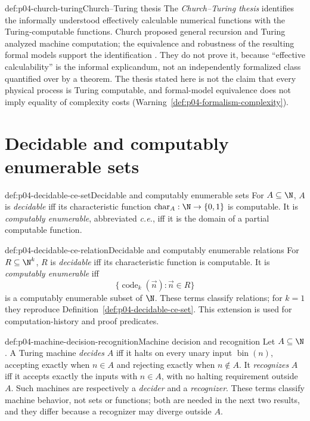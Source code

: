 \begin{proofboundary}{def:p04-church-turing}{Church--Turing thesis}
The \emph{Church--Turing thesis} identifies the informally understood
effectively calculable numerical functions with the Turing-computable
functions.  Church proposed general recursion and Turing analyzed machine
computation; the equivalence and robustness of the resulting formal models
support the identification
\cite{Church1936,Turing1937Lambda,Soare1996ComputabilityRecursion}.  They do
not prove it, because ``effective calculability'' is the informal explicandum,
not an independently formalized class quantified over by a theorem.  The
thesis stated here is not the claim that every physical process is Turing
computable, and formal-model equivalence does not imply equality of complexity
costs (Warning~\ref{def:p04-formalism-complexity}).
\end{proofboundary}

\section{Decidable and computably enumerable sets}
\label{sec:p04-decidable-ce}

\begin{hbdefinition}{def:p04-decidable-ce-set}{Decidable and computably enumerable sets}
For \(A\subseteq\N\), \(A\) is \emph{decidable} iff its characteristic
function \(\operatorname{char}_A:\N\to\{0,1\}\) is computable.  It is \emph{computably
enumerable}, abbreviated \emph{c.e.}, iff it is the domain of a partial
computable function.
\end{hbdefinition}

\begin{hbdefinition}{def:p04-decidable-ce-relation}{Decidable and computably enumerable relations}
For \(R\subseteq\N^k\), \(R\) is \emph{decidable} iff its characteristic
function is computable.  It is \emph{computably enumerable} iff
\[
  \{\operatorname{code}_k(\vec n):\vec n\in R\}
\]
is a computably enumerable subset of \(\N\).  These terms classify relations;
for \(k=1\) they reproduce Definition~\ref{def:p04-decidable-ce-set}.  This
extension is used for computation-history and proof predicates.
\end{hbdefinition}

\begin{hbdefinition}{def:p04-machine-decision-recognition}{Machine decision and recognition}
Let \(A\subseteq\N\).  A Turing machine \emph{decides} \(A\) iff it halts
on every unary input \(\operatorname{bin}(n)\), accepting exactly when
\(n\in A\) and rejecting exactly when \(n\notin A\).  It \emph{recognizes}
\(A\) iff it accepts exactly the inputs with \(n\in A\), with no halting
requirement outside \(A\).  Such machines are respectively a \emph{decider}
and a \emph{recognizer}.  These terms classify machine behavior, not sets or
functions; both are needed in the next two results, and they differ because a
recognizer may diverge outside \(A\).
\end{hbdefinition}

